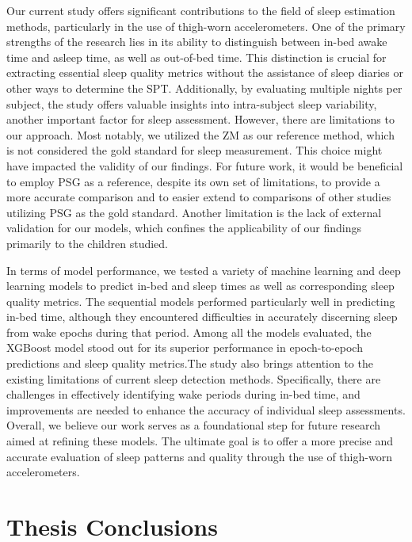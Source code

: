 \documentclass[
  10pt,
]{scrbook}
\begin{document}
Our current study offers significant contributions to the field of sleep
estimation methods, particularly in the use of thigh-worn
accelerometers. One of the primary strengths of the research lies in its
ability to distinguish between in-bed awake time and asleep time, as
well as out-of-bed time. This distinction is crucial for extracting
essential sleep quality metrics without the assistance of sleep diaries
or other ways to determine the SPT. Additionally, by evaluating multiple
nights per subject, the study offers valuable insights into
intra-subject sleep variability, another important factor for sleep
assessment. However, there are limitations to our approach. Most
notably, we utilized the ZM as our reference method, which is not
considered the gold standard for sleep measurement. This choice might
have impacted the validity of our findings. For future work, it would be
beneficial to employ PSG as a reference, despite its own set of
limitations, to provide a more accurate comparison and to easier extend
to comparisons of other studies utilizing PSG as the gold standard.
Another limitation is the lack of external validation for our models,
which confines the applicability of our findings primarily to the
children studied.

In terms of model performance, we tested a variety of machine learning
and deep learning models to predict in-bed and sleep times as well as
corresponding sleep quality metrics. The sequential models performed
particularly well in predicting in-bed time, although they encountered
difficulties in accurately discerning sleep from wake epochs during that
period. Among all the models evaluated, the XGBoost model stood out for
its superior performance in epoch-to-epoch predictions and sleep quality
metrics.The study also brings attention to the existing limitations of
current sleep detection methods. Specifically, there are challenges in
effectively identifying wake periods during in-bed time, and
improvements are needed to enhance the accuracy of individual sleep
assessments. Overall, we believe our work serves as a foundational step
for future research aimed at refining these models. The ultimate goal is
to offer a more precise and accurate evaluation of sleep patterns and
quality through the use of thigh-worn accelerometers.

\hypertarget{thesis-conclusions}{%
\chapter{Thesis Conclusions}\label{thesis-conclusions}}
\end{document}
